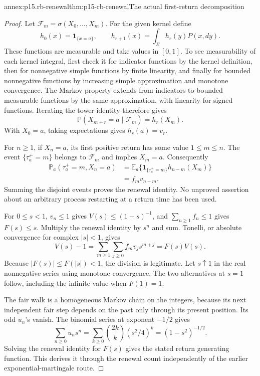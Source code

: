 \begin{annexitem}{annex:p15.rb-renewal}{thm:p15-rb-renewal}{The actual first-return decomposition}
\begin{proof}
Let \(\mathcal F_m=\sigma(X_0,\ldots,X_m)\).
For the given kernel define
\[
 h_0(x)=\mathbf1_{\{x=a\}},\qquad
 h_{r+1}(x)=\int_E h_r(y)P(x,dy).
 \]
These functions are measurable and take values in \([0,1]\).
To see measurability of each kernel integral, first check it for
indicator functions by the kernel definition, then for nonnegative
simple functions by finite linearity, and finally for bounded
nonnegative functions by increasing simple approximation and
monotone convergence.
The Markov property extends from indicators to bounded measurable
functions by the same approximation, with linearity for signed
functions. Iterating the tower identity therefore gives
\[
 \mathbb P(X_{m+r}=a\mid\mathcal F_m)=h_r(X_m).
 \]
With \(X_0=a\), taking expectations gives \(h_r(a)=v_r\).

For \(n\geq1\), if \(X_n=a\), its first positive return has
some value \(1\leq m\leq n\). The event
\(\{\tau_a^+=m\}\) belongs to \(\mathcal F_m\) and implies \(X_m=a\).
Consequently
\[
 \begin{split}
 \mathbb P_a(\tau_a^+=m,X_n=a)
 &=\mathbb E_a\{\mathbf1_{\{\tau_a^+=m\}}h_{n-m}(X_m)\}\\
 &=f_m v_{n-m}.
 \end{split}
 \]
Summing the disjoint events proves the renewal identity.
No unproved assertion about an arbitrary process restarting
at a return time has been used.

For \(0\leq s<1\), \(v_n\leq1\) gives
\(V(s)\leq(1-s)^{-1}\), and
\(\sum_{n\geq1}f_n\leq1\) gives \(F(s)\leq s\).
Multiply the renewal identity by \(s^n\) and sum.
Tonelli, or absolute convergence for complex \(|s|<1\),
gives
\[
 V(s)-1
 =\sum_{m\geq1}\sum_{j\geq0}f_m v_j s^{m+j}
 =F(s)V(s).
 \]
Because \(|F(s)|\leq F(|s|)<1\), the division is legitimate.
Let \(s\uparrow1\) in the real nonnegative series using
monotone convergence. The two alternatives at \(s=1\) follow,
including the infinite value when \(F(1)=1\).

The fair walk is a homogeneous Markov chain on the integers,
because its next independent fair step depends on the past
only through its present position.
Its odd \(u_n\)'s vanish. The binomial series at exponent
\(-1/2\) gives
\[
 \sum_{n\geq0}u_ns^n
 =\sum_{k\geq0}\binom{2k}{k}(s^2/4)^k
 =(1-s^2)^{-1/2}.
 \]
Solving the renewal identity for \(F(s)\) gives the stated
return generating function. This derives it through the
renewal count independently of the earlier exponential-martingale route.
\end{proof}
\end{annexitem}

